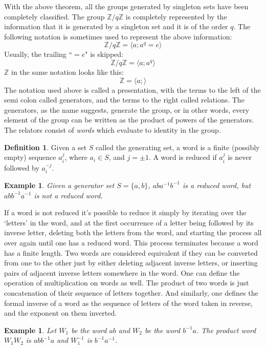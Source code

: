 \documentclass[12pt, titlepage]{article}
\newtheorem{exmp}[thm]{Example}
\theoremstyle{definition}
\newtheorem{defn}{Definition}[section]
\begin{document}
With the above theorem, all the groups generated by singleton sets have been completely classified. The group $\mathbb{Z}/q\mathbb{Z}$ is completely represented by the information that it is generated by a singleton set and it is of the order $q$. The following notation is sometimes used to represent the above information:
$$\mathbb{Z}/q\mathbb{Z} = \langle a;a^q=e \rangle$$
Usually, the trailing ``$=e$" is skipped:
$$\mathbb{Z}/q\mathbb{Z} = \langle a;a^q \rangle$$
$\mathbb{Z}$ in the same notation looks like this:
$$\mathbb{Z} = \langle a;\rangle$$
The notation used above is called a presentation, with the terms to the left of the semi colon called generators, and the terms to the right called relations. The generators, as the name suggests, generate the group, or in other words, every element of the group can be written as the product of powers of the generators. The relators consist of \emph{words} which evaluate to identity in the group. 
\begin{defn}
Given a set $S$ called the generating set, a word is a finite (possibly empty) sequence $a_{i}^{j}$, where $a_i \in S$, and $j = \pm 1$. A word is reduced if $a_i^{j}$ is never followed by $a_i^{-j}$.
\end{defn}
\begin{exmp}
Given a generator set $S = \{a,b\}$, $aba^{-1}b^{-1}$ is a reduced word, but $abb^{-1}a^{-1}$ is not a reduced word.
\end{exmp}

If a word is not reduced it's possible to reduce it simply by iterating over the `letters' in the word, and at the first occurrence of a letter being followed by its inverse letter, deleting both the letters from the word, and starting the process all over again until one has a reduced word. This process terminates because a word has a finite length. Two words are considered equivalent if they can be converted from one to the other just by either deleting adjacent inverse letters, or inserting pairs of adjacent inverse letters somewhere in the word. One can define the operation of multiplication on words as well. The product of two words is just concatenation of their sequence of letters together. And similarly, one defines the formal inverse of a word as the sequence of letters of the word taken in reverse, and the exponent on them inverted.

\begin{exmp}
Let $W_1$ be the word $ab$ and $W_2$ be the word $b^{-1}a$. The product word $W_1W_2$ is $abb^{-1}a$ and $W_1^{-1}$ is $b^{-1}a^{-1}$.
\end{exmp}
\end{document}
